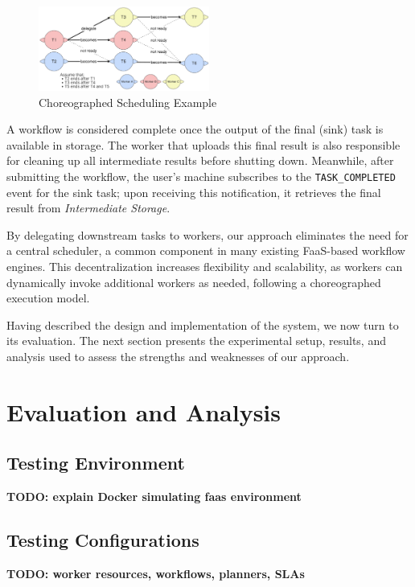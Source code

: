 \documentclass[conference]{IEEEtran}
\begin{document}
\begin{figure}[h]
    \centering
    \includegraphics[width=0.5\textwidth]{figures/choreographed_execution_example.png}
    \caption{Choreographed Scheduling Example}
    \label{fig:choreographed_scheduling_example}
\end{figure}

A workflow is considered complete once the output of the final (sink) task is available in storage. The worker that uploads this final result is also responsible for cleaning up all intermediate results before shutting down. Meanwhile, after submitting the workflow, the user's machine subscribes to the \texttt{TASK\_COMPLETED} event for the sink task; upon receiving this notification, it retrieves the final result from \textit{Intermediate Storage}.

By delegating downstream tasks to workers, our approach eliminates the need for a central scheduler, a common component in many existing FaaS-based workflow engines. This decentralization increases flexibility and scalability, as workers can dynamically invoke additional workers as needed, following a choreographed execution model.

Having described the design and implementation of the system, we now turn to its evaluation. The next section presents the experimental setup, results, and analysis used to assess the strengths and weaknesses of our approach.


\section{Evaluation and Analysis}

\subsection{Testing Environment}
\textbf{TODO: explain Docker simulating faas environment}
\subsection{Testing Configurations}
\textbf{TODO: worker resources, workflows, planners, SLAs}
\end{document}
